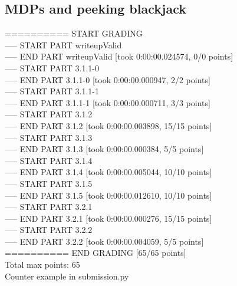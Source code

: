 \documentclass[11pt]{article}
\begin{document}
\begin{onehalfspace}
\section{MDPs and peeking blackjack}
========== START GRADING \\
----- START PART writeupValid \\
----- END PART writeupValid [took 0:00:00.024574, 0/0 points] \\
----- START PART 3.1.1-0 \\
----- END PART 3.1.1-0 [took 0:00:00.000947, 2/2 points] \\
----- START PART 3.1.1-1 \\
----- END PART 3.1.1-1 [took 0:00:00.000711, 3/3 points] \\
----- START PART 3.1.2 \\
----- END PART 3.1.2 [took 0:00:00.003898, 15/15 points] \\
----- START PART 3.1.3 \\
----- END PART 3.1.3 [took 0:00:00.000384, 5/5 points] \\
----- START PART 3.1.4 \\
----- END PART 3.1.4 [took 0:00:00.005044, 10/10 points] \\
----- START PART 3.1.5 \\
----- END PART 3.1.5 [took 0:00:00.012610, 10/10 points] \\
----- START PART 3.2.1 \\
----- END PART 3.2.1 [took 0:00:00.000276, 15/15 points] \\
----- START PART 3.2.2 \\
----- END PART 3.2.2 [took 0:00:00.004059, 5/5 points] \\
========== END GRADING [65/65 points] \\
Total max points: 65 \\
Counter example in submission.py

\end{onehalfspace}
\end{document}

